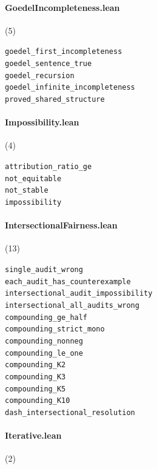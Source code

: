 \paragraph{GoedelIncompleteness.lean} (5)

{\footnotesize
\texttt{goedel\_first\_incompleteness}\\
\texttt{goedel\_sentence\_true}\\
\texttt{goedel\_recursion}\\
\texttt{goedel\_infinite\_incompleteness}\\
\texttt{proved\_shared\_structure}\\
}

\paragraph{Impossibility.lean} (4)

{\footnotesize
\texttt{attribution\_ratio\_ge}\\
\texttt{not\_equitable}\\
\texttt{not\_stable}\\
\texttt{impossibility}\\
}

\paragraph{IntersectionalFairness.lean} (13)

{\footnotesize
\texttt{single\_audit\_wrong}\\
\texttt{each\_audit\_has\_counterexample}\\
\texttt{intersectional\_audit\_impossibility}\\
\texttt{intersectional\_all\_audits\_wrong}\\
\texttt{compounding\_ge\_half}\\
\texttt{compounding\_strict\_mono}\\
\texttt{compounding\_nonneg}\\
\texttt{compounding\_le\_one}\\
\texttt{compounding\_K2}\\
\texttt{compounding\_K3}\\
\texttt{compounding\_K5}\\
\texttt{compounding\_K10}\\
\texttt{dash\_intersectional\_resolution}\\
}

\paragraph{Iterative.lean} (2)

